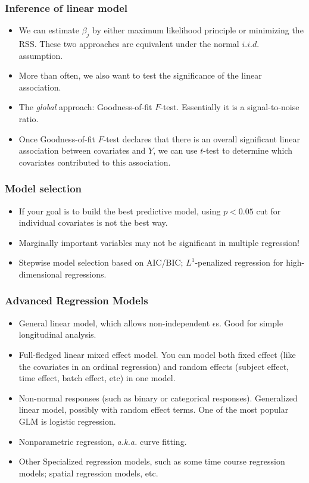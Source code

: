 \begin{frame}
  \frametitle{Inference of linear model}
  \begin{itemize}
  \item We can estimate $\beta_{j}$ by either maximum likelihood
    principle or minimizing the RSS.  These two approaches are
    equivalent under the normal $i.i.d.$ assumption.
  \item More than often, we also want to test the \alert{significance}
    of the linear association.
  \item The \emph{global} approach: Goodness-of-fit
    $F$-test. Essentially it is a signal-to-noise ratio.
  \item Once Goodness-of-fit $F$-test declares that there is an
    overall significant linear association between covariates and $Y$,
    we can use $t$-test to determine \alert{which} covariates
    contributed to this association.
  \end{itemize}
\end{frame}

\begin{frame}
  \frametitle{Model selection}
  \begin{itemize}
  \item If your goal is to build the best predictive model, using
    $p<0.05$ cut for individual covariates is not the best way.
  \item Marginally important variables may not be significant in
    multiple regression!
  \item Stepwise model selection based on AIC/BIC; $L^{1}$-penalized
    regression for high-dimensional regressions.
  \end{itemize}
\end{frame}

\begin{frame}
  \frametitle{Advanced Regression Models}
  \begin{itemize}
  \item General linear model, which allows non-independent
    $\epsilon$s.  Good for simple longitudinal analysis.
  \item Full-fledged linear mixed effect model.  You can model both
    fixed effect (like the covariates in an ordinal regression) and
    random effects (subject effect, time effect, batch effect, etc) in
    one model.
  \item Non-normal responses (such as binary or categorical
    responses).  Generalized linear model, possibly with random effect
    terms.  One of the most popular GLM is logistic regression.
  \item Nonparametric regression, \textit{a.k.a.} curve fitting.
  \item Other Specialized regression models, such as some time course
    regression models; spatial regression models, etc.
  \end{itemize}
\end{frame}



